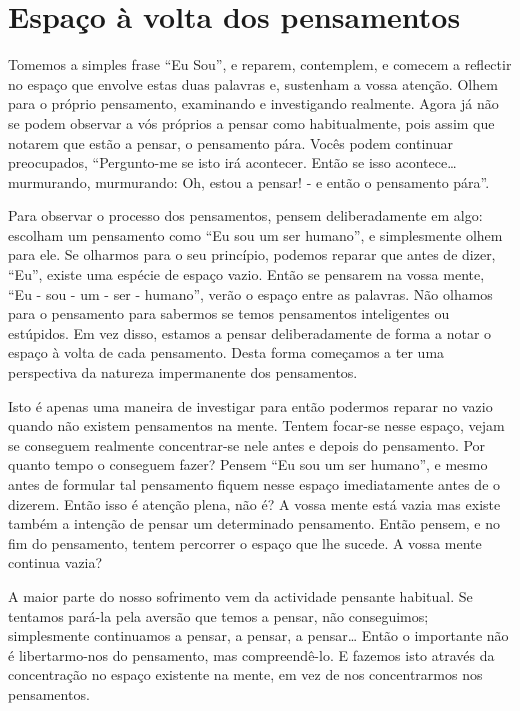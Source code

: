\section{Espaço à volta dos pensamentos}

Tomemos a simples frase ``Eu Sou'', e reparem, contemplem, e comecem a
reflectir no espaço que envolve estas duas palavras e, sustenham a vossa
atenção. Olhem para o próprio pensamento, examinando e investigando
realmente. Agora já não se podem observar a vós próprios a pensar como
habitualmente, pois assim que notarem que estão a pensar, o pensamento
pára. Vocês podem continuar preocupados, ``Pergunto-me se isto irá
acontecer. Então se isso acontece\ldots{} murmurando, murmurando: Oh, estou a
pensar! - e então o pensamento pára''.

Para observar o processo dos pensamentos, pensem deliberadamente em
algo: escolham um pensamento como ``Eu sou um ser humano'', e
simplesmente olhem para ele. Se olharmos para o seu princípio, podemos
reparar que antes de dizer, ``Eu'', existe uma espécie de espaço vazio.
Então se pensarem na vossa mente, ``Eu - sou - um - ser - humano'',
verão o espaço entre as palavras. Não olhamos para o pensamento para
sabermos se temos pensamentos inteligentes ou estúpidos. Em vez disso,
estamos a pensar deliberadamente de forma a notar o espaço à volta de
cada pensamento. Desta forma começamos a ter uma perspectiva da natureza
impermanente dos pensamentos.

Isto é apenas uma maneira de investigar para então podermos reparar no
vazio quando não existem pensamentos na mente. Tentem focar-se nesse
espaço, vejam se conseguem realmente concentrar-se nele antes e depois
do pensamento. Por quanto tempo o conseguem fazer? Pensem ``Eu sou um
ser humano'', e mesmo antes de formular tal pensamento fiquem nesse
espaço imediatamente antes de o dizerem. Então isso é atenção plena, não
é? A vossa mente está vazia mas existe também a intenção de pensar um
determinado pensamento. Então pensem, e no fim do pensamento, tentem
percorrer o espaço que lhe sucede. A vossa mente continua vazia?

A maior parte do nosso sofrimento vem da actividade pensante habitual.
Se tentamos pará-la pela aversão que temos a pensar, não conseguimos;
simplesmente continuamos a pensar, a pensar, a pensar\ldots{} Então o
importante não é libertarmo-nos do pensamento, mas compreendê-lo. E
fazemos isto através da concentração no espaço existente na mente, em
vez de nos concentrarmos nos pensamentos.

